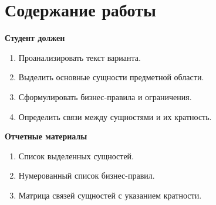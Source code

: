 \section{Содержание работы}

\textbf{Студент должен}\par
\begin{enumerate}
  \item Проанализировать текст варианта.
  \item Выделить основные сущности предметной области.
  \item Сформулировать бизнес-правила и ограничения.
  \item Определить связи между сущностями и их кратность.

\end{enumerate}

\textbf{Отчетные материалы}\par
\begin{enumerate}
  \item Список выделенных сущностей.
  \item Нумерованный список бизнес-правил.
  \item Матрица связей сущностей с указанием кратности.
\end{enumerate}